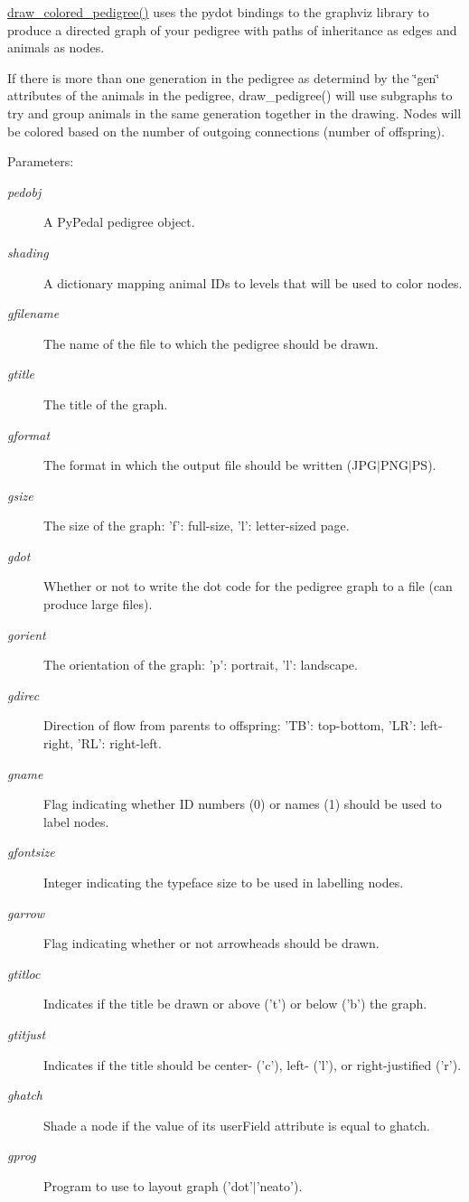 \hyperlink{namespacePyPedal_1_1pyp__jbc_dd01c0570f87aaac52c6cc89e39dacdb}{draw\_\-colored\_\-pedigree()} uses the pydot bindings to the graphviz library to produce a directed graph of your pedigree with paths of inheritance as edges and animals as nodes. 

If there is more than one generation in the pedigree as determind by the \char`\"{}gen\char`\"{} attributes of the animals in the pedigree, draw\_\-pedigree() will use subgraphs to try and group animals in the same generation together in the drawing. Nodes will be colored based on the number of outgoing connections (number of offspring). \begin{Desc}
\item[Parameters:]
\begin{description}
\item[{\em pedobj}]A Py\-Pedal pedigree object. \item[{\em shading}]A dictionary mapping animal IDs to levels that will be used to color nodes. \item[{\em gfilename}]The name of the file to which the pedigree should be drawn. \item[{\em gtitle}]The title of the graph. \item[{\em gformat}]The format in which the output file should be written (JPG$|$PNG$|$PS). \item[{\em gsize}]The size of the graph: 'f': full-size, 'l': letter-sized page. \item[{\em gdot}]Whether or not to write the dot code for the pedigree graph to a file (can produce large files). \item[{\em gorient}]The orientation of the graph: 'p': portrait, 'l': landscape. \item[{\em gdirec}]Direction of flow from parents to offspring: 'TB': top-bottom, 'LR': left-right, 'RL': right-left. \item[{\em gname}]Flag indicating whether ID numbers (0) or names (1) should be used to label nodes. \item[{\em gfontsize}]Integer indicating the typeface size to be used in labelling nodes. \item[{\em garrow}]Flag indicating whether or not arrowheads should be drawn. \item[{\em gtitloc}]Indicates if the title be drawn or above ('t') or below ('b') the graph. \item[{\em gtitjust}]Indicates if the title should be center- ('c'), left- ('l'), or right-justified ('r'). \item[{\em ghatch}]Shade a node if the value of its user\-Field attribute is equal to ghatch. \item[{\em gprog}]Program to use to layout graph ('dot'$|$'neato'). \end{description}
\end{Desc}
